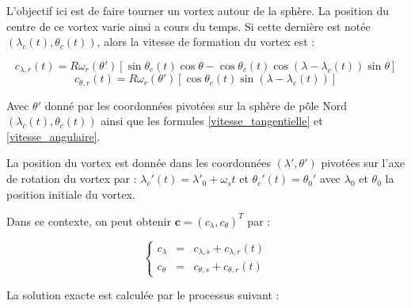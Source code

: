 L'objectif ici est de faire tourner un vortex autour de la sphère. La position du centre de ce vortex varie ainsi a cours du temps. Si cette dernière est notée $( \lambda_c (t), \theta_c (t))$, alors la vitesse de formation du vortex est :

\begin{equation}
c_{\lambda, r}(t) = R \omega_r ( \theta' ) \left[ \sin \theta_c (t) \cos \theta - \cos \theta_c (t) \cos ( \lambda - \lambda_c (t) ) \sin \theta \right]
\label{vitesse_lambda_vortex}
\end{equation}
\begin{equation}
c_{\theta, r}(t) = R \omega_r ( \theta' ) \left[ \cos \theta_c (t) \sin ( \lambda - \lambda_c (t) ) \right]
\label{vitesse_theta_vortex}
\end{equation}

Avec $\theta'$ donné par les coordonnées pivotées sur la sphère de p\^ole Nord $ ( \lambda_c (t), \theta_c (t) )$ ainsi que les formules \eqref{vitesse_tangentielle} et \eqref{vitesse_angulaire}.

La position du vortex est donnée dans les coordonnées $( \lambda', \theta')$ pivotées sur l'axe de rotation du vortex par : $\lambda_c ' (t) = \lambda' _0 + \omega_s t $ et $\theta_c ' (t) = \theta_0 '$ avec $\lambda_0$ et $\theta_0$ la position initiale du vortex.

Dans ce contexte, on peut obtenir $\mathbf{c} = ( c_{\lambda}, c_{\theta} )^T $ par :

\begin{equation}
  \left\{
  \begin{array}{rcl}
    c_{\lambda} & = & c_{\lambda,s} + c_{\lambda,r} (t) \\
    c_{\theta} & = & c_{\theta,s} + c_{\theta,r} (t)
  \end{array}
  \right.
\end{equation}

La solution exacte est calculée par le processus suivant :

